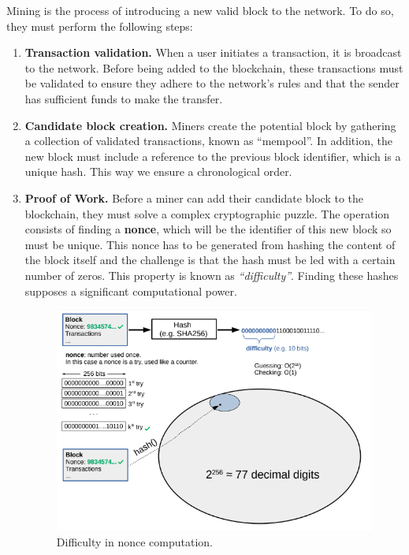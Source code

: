 \documentclass[a4paper,12pt]{article}
\begin{document}
\begin{appendices}
{Mining is the process of introducing a new valid block to the network. To do so, they must perform the following steps: 
\begin{enumerate}
    \item \textbf{Transaction validation.} When a user initiates a transaction, it is broadcast to the network. Before being added to the blockchain, these transactions must be validated to ensure they adhere to the network's rules and that the sender has sufficient funds to make the transfer.
    \item \textbf{Candidate block creation.} Miners create the potential block by gathering a collection of validated transactions, known as ``mempool''. In addition, the new block must include a reference to the previous block identifier, which is a unique hash. This way we ensure a chronological order.
    \item \textbf{Proof of Work.} Before a miner can add their candidate block to the blockchain, they must solve a complex cryptographic puzzle. The operation consists of finding a \textbf{\gls{nonce}}, which will be the identifier of this new block so must be unique. This nonce has to be generated from hashing the content of the block itself and the challenge is that the hash must be led with a certain number of zeros. This property is known as \textit{``difficulty''}. Finding these hashes supposes a significant computational power.
        \begin{figure}[H]
        \centering
        \includegraphics[width=12cm]{img/chapter_2/nonce-computation.png}
        \caption[Difficulty in nonce computation]{\footnotesize{Difficulty in nonce computation.}}
        \label{fig:Nonce-computation}
        \end{figure}
        

\end{enumerate}}
\end{appendices}
\end{document}
